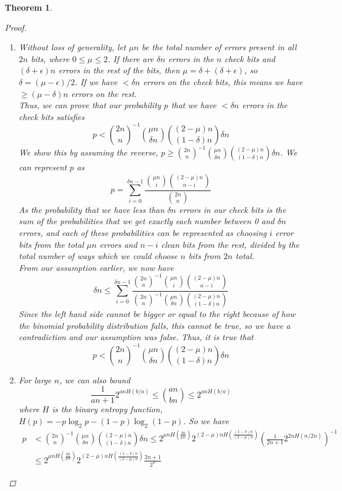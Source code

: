 \documentclass[12]{amsart}
\newtheorem{theorem}{Theorem}[section]
\begin{document}
\begin{theorem}
\begin{proof}
\begin{enumerate}
\item Without loss of generality, let $\mu n$ be the total number of errors present in all $2n$ bits, where $0\leq \mu \leq 2$. If there are $\delta n$ errors in the $n$ check bits and $(\delta + \epsilon)n$ errors in the rest of the bits, then $\mu=\delta+(\delta+\epsilon)$, so $\delta =(\mu -\epsilon)/2$. If we have $< \delta n$ errors on the check bits, this means we have $ \geq (\mu -\delta)n$ errors on the rest. \\
Thus, we can prove that our probability $p$ that we have $< \delta n$ errors in the check bits satisfies
$$p<{2n\choose n}^{-1}{\mu n \choose \delta n}{(2-\mu)n \choose (1-\delta)n}\delta n
$$
We show this by assuming the reverse, $p\geq {2n\choose n}^{-1}{\mu n \choose \delta n}{(2-\mu)n \choose (1-\delta)n}\delta n$. We can represent $p$ as
$$p=\sum_{i=0}^{\delta n-1}\frac{{\mu n \choose i}{(2-\mu)n\choose n-i}}{{2n\choose n}}$$
As the probability that we have less than $\delta n$ errors in our check bits is the sum of the probabilities that we get exactly each number between 0 and $\delta n$ errors, and each of these probabilities can be represented as choosing $i$ error bits from the total $\mu n$ errors and $n-i$ clean bits from the rest, divided by the total number of ways which we could choose $n$ bits from $2n$ total. \\
From our assumption earlier, we now have $$\delta n \leq 
\sum_{i=0}^{\delta n-1}\frac{{2n\choose n}^{-1}{\mu n \choose i}{(2-\mu)n\choose n-i}}{{2n\choose n}^{-1}{\mu n \choose \delta n}{(2-\mu)n \choose (1-\delta)n}}$$
Since the left hand side cannot be bigger or equal to the right because of how the binomial probability distribution falls, this cannot be true, so we have a contradiction and our assumption was false. Thus, it is true that 
$$p<{2n\choose n}^{-1}{\mu n \choose \delta n}{(2-\mu)n \choose (1-\delta)n}\delta n
$$
\item For large $n$, we can also bound 
$$\frac{1}{an+1}2^{anH(b/a)}\leq {an \choose bn}\leq 2^{anH(b/a)}
$$
where $H$ is the binary entropy function, $H(p)=-p\log_2p-(1-p)\log_2(1-p)$. So we have 
\begin{align*}
p&<{2n\choose n}^{-1}{\mu n \choose \delta n}{(2-\mu)n \choose (1-\delta)n}\delta n 
\leq 2^{\mu nH(\frac{\delta n}{\mu n})}2^{(2-\mu)nH(\frac{(1-\delta)n}{(2-\mu)n})}(\frac{1} {2n+1}2^{2nH(n/2n)})^{-1}\\
&\leq 2^{\mu n H(\frac{\delta n}{\mu n})}2^{(2-\mu)nH(\frac{(1-\delta)n}{(2-\mu)n})}\frac{2n+1}{2^n}

\end{align*}
\end{enumerate}
\end{proof}
\end{theorem}
\end{document}
